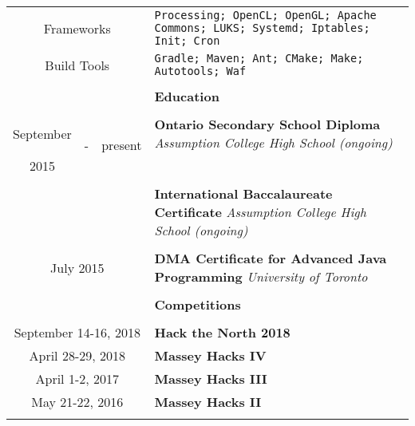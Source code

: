\documentclass[10pt]{article}
\begin{document}
\begin{table}[ht]
\begin{tabular}{@{\hspace{0mm}}c@{\hspace{1mm}}c@{\hspace{3mm}}cl}
            \multicolumn{3}{c}{Frameworks} & \texttt{Processing; OpenCL; OpenGL; Apache Commons; LUKS; Systemd; Iptables; Init; Cron}\\[-1mm]
            \multicolumn{3}{c}{Build Tools} & \texttt{Gradle; Maven; Ant; CMake; Make; Autotools; Waf}\\[-1mm]
            & & & \color{maroon}{\rule{14cm}{0.75pt}}\\
            & & & \large{\textbf{Education}}\\[-2mm]
            & & & \color{maroon}{\rule{14cm}{0.75pt}}\\
            September & \multirow{2}{*}{-} & \multirow{2}{*}{present} & \textbf{Ontario Secondary School Diploma} \textit{Assumption College High School (ongoing)}\\[-1mm]
            2015 & & &\\
            \vspace*{-6.5mm}\\
            & & & \textbf{International Baccalaureate Certificate} \textit{Assumption College High School (ongoing)}\\
            \vspace*{-2.75mm}\\
            \multicolumn{3}{c}{July 2015} & \textbf{DMA Certificate for Advanced Java Programming} \textit{University of Toronto}\\[1mm]
            & & & \color{maroon}{\rule{14cm}{0.75pt}}\\
            & & & \large{\textbf{Competitions}}\\[-2mm]
            & & & \color{maroon}{\rule{14cm}{0.75pt}}\\
            \multicolumn{3}{c}{September 14-16, 2018} & \textbf{Hack the North 2018}\\
            \multicolumn{3}{c}{April 28-29, 2018} & \textbf{Massey Hacks IV}\\
            \multicolumn{3}{c}{April 1-2, 2017} & \textbf{Massey Hacks III}\\
            \multicolumn{3}{c}{May 21-22, 2016} & \textbf{Massey Hacks II}\\
            & & & \color{maroon}{\rule{14cm}{0.75pt}}\\

\end{tabular}
\end{table}
\end{document}
